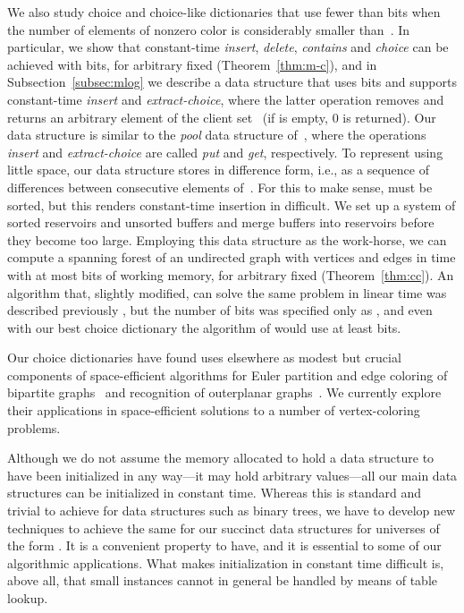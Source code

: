 \documentclass[envcountsame,envcountsect,undated,nolinenumbers]{lnthi}
\def\Tvn#1{\hbox{\textit{#1\/}}}
\begin{document}
We also study choice and choice-like dictionaries
that use fewer than  bits when the number
 of elements of nonzero color is considerably
smaller than~.
In particular, we
show that constant-time
\Tvn{insert}, \Tvn{delete}, \Tvn{contains} and \Tvn{choice}
can be achieved with
 bits, for arbitrary
fixed  (Theorem~\ref{thm:m-c}),
and in Subsection~\ref{subsec:mlog}
we describe
a data structure that uses
 bits
and supports
constant-time \Tvn{insert} and \Tvn{extract-choice},
where the latter operation
removes and returns an arbitrary element
of the client set~
(if  is empty, 0 is returned).
Our data structure is similar to the \emph{pool}
data structure of~\cite{HerS08}, where the operations
\Tvn{insert} and \Tvn{extract-choice} are called
\Tvn{put} and \Tvn{get}, respectively.
To represent 
using little space, our data structure stores 
in difference form, i.e., as a sequence of differences
between consecutive elements of~.
For this to make sense,  must be sorted, but this
renders constant-time insertion in  difficult.
We set up a system of sorted reservoirs and
unsorted buffers and merge buffers into reservoirs
before they become too large.
Employing this data structure as the work-horse,
we can compute a spanning forest of an undirected
graph
with  vertices and  edges
in 
time with at most  bits of
working memory, for arbitrary
fixed  (Theorem~\ref{thm:cc}).
An algorithm that, slightly modified, can solve
the same problem in linear time was described previously
\cite[Theorem~5.1]{ElmHK15}, but the number of bits was
specified only as , and even with our best
choice dictionary the algorithm of
\cite{ElmHK15} would use at least
 bits.

Our choice dictionaries have found uses elsewhere as
modest but crucial components of space-efficient
algorithms for Euler partition and
edge coloring of bipartite graphs~\cite{HagKL17}
and recognition of
outerplanar graphs~\cite{KamKL16}.
We currently explore their applications in
space-efficient solutions to a number of
vertex-coloring problems.

Although we do not assume the memory allocated
to hold a data structure to have been initialized in
any way---it may hold arbitrary values---all
our main data structures can be initialized in constant time.
Whereas this is standard and trivial to achieve for
data structures such as binary trees, we have to
develop new techniques to achieve the same
for our succinct data structures for universes
of the form .
It is a convenient property to have, and it
is essential to some of our algorithmic applications.
What makes initialization in constant time difficult is,
above all, that small instances cannot in general
be handled by means of table lookup.
\end{document}
